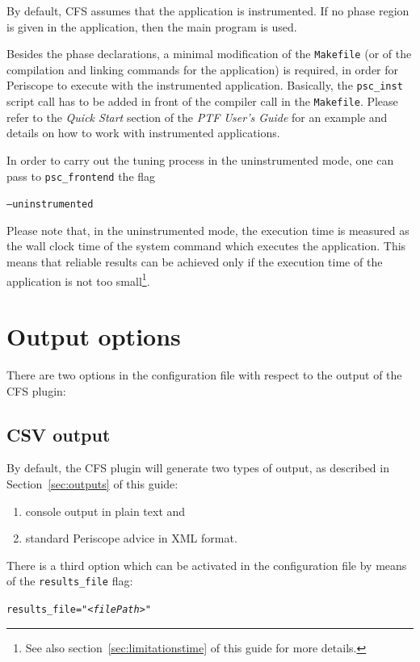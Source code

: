 \documentclass[11pt,a4paper, oneside]{book} %
\begin{document}
By default, CFS assumes that the application is instrumented. If no phase region is given in the application, then the main program is used.

Besides the phase declarations, a minimal modification of the \texttt{Makefile} (or of the compilation and linking commands for the application) is required, in order for Periscope to execute with the instrumented application. Basically, the \texttt{psc\_inst} script call has to be added in front of the compiler call in the \texttt{Makefile}. Please refer to the \textit{Quick Start} section of the \textit{PTF User's Guide} for an example and details on how to work with instrumented applications.

In order to carry out the tuning process in the uninstrumented mode, one can pass to \texttt{psc\_frontend} the flag

\begin{center}
\texttt{--uninstrumented}
\end{center}

Please note that, in the uninstrumented mode, the execution time is measured as the wall clock time of the system command which executes the application. This means that reliable results can be achieved only if the execution time of the application is not too small\footnote{See also section~\ref{sec:limitationstime} of this guide for more details.}.

\section{Output options}

There are two options in the configuration file with respect to the output of the CFS plugin:

\subsection{CSV output}
By default, the CFS plugin will generate two types of output, as described in Section~\ref{sec:outputs} of this guide:
\begin{enumerate}
	\item console output in plain text and
	\item standard Periscope advice in XML format.
\end{enumerate}

There is a third option which can be activated in the configuration file by means of the \texttt{results\_file} flag:

\begin{center}
\begin{minipage}{0.8\textwidth}
	\texttt{results\_file="\textit{<filePath>}"}
\end{minipage}
\end{center}
\end{document}

